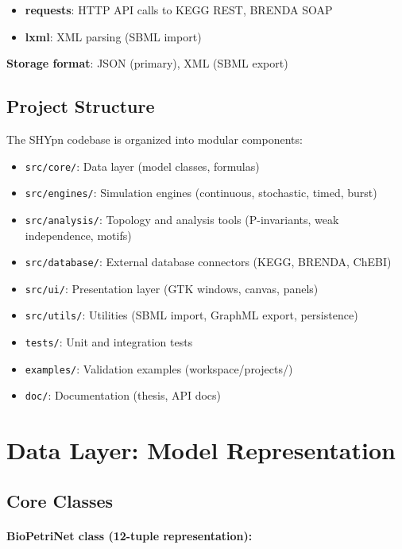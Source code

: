 \begin{itemize}
    \item \textbf{requests}: HTTP API calls to KEGG REST, BRENDA SOAP
    \item \textbf{lxml}: XML parsing (SBML import)
\end{itemize}

\textbf{Storage format}: JSON (primary), XML (SBML export)

\subsection{Project Structure}
\label{subsec:project-structure}

The SHYpn codebase is organized into modular components:

\begin{itemize}
    \item \texttt{src/core/}: Data layer (model classes, formulas)
    \item \texttt{src/engines/}: Simulation engines (continuous, stochastic, timed, burst)
    \item \texttt{src/analysis/}: Topology and analysis tools (P-invariants, weak independence, motifs)
    \item \texttt{src/database/}: External database connectors (KEGG, BRENDA, ChEBI)
    \item \texttt{src/ui/}: Presentation layer (GTK windows, canvas, panels)
    \item \texttt{src/utils/}: Utilities (SBML import, GraphML export, persistence)
    \item \texttt{tests/}: Unit and integration tests
    \item \texttt{examples/}: Validation examples (workspace/projects/)
    \item \texttt{doc/}: Documentation (thesis, API docs)
\end{itemize}

\section{Data Layer: Model Representation}
\label{sec:model-representation}

\subsection{Core Classes}
\label{subsec:core-classes}

\paragraph{BioPetriNet class (12-tuple representation):}

